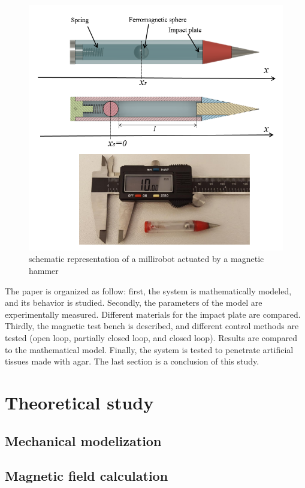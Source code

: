 \documentclass[letterpaper, 10 pt, conference]{ieeeconf}  %
\begin{document}
\begin{figure}
  \includegraphics[width=\linewidth]{figure1-2.png}
  \caption{schematic representation of a millirobot actuated by a magnetic hammer}
  \label{millirobot}
\end{figure}

The paper is organized as follow: first, the system is mathematically modeled, and its behavior is studied. Secondly, the parameters of the model are experimentally measured. Different materials for the impact plate are compared. Thirdly, the magnetic test bench is described, and different control methods are tested (open loop, partially closed loop, and closed loop). Results are compared to the mathematical model. Finally, the system is tested to penetrate artificial tissues made with agar. The last section is a conclusion of this study.


\section{Theoretical study}

\subsection{Mechanical modelization}

\subsection{Magnetic field calculation}
\end{document}
